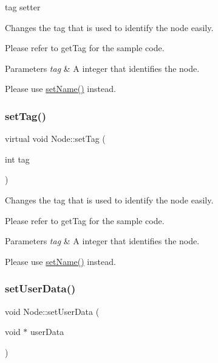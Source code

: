 tag setter 

Changes the tag that is used to identify the node easily.

Please refer to get\+Tag for the sample code.


\begin{DoxyParams}{Parameters}
{\em tag} & A integer that identifies the node.\\
\hline
\end{DoxyParams}
Please use {\ttfamily \hyperlink{classNode_a519730c66b26e65c6539a908e6905edc}{set\+Name()}} instead. \mbox{\label{classNode_ad07179e61008c76e7a996636267c74a5}} 
\subsubsection{\texorpdfstring{set\+Tag()}{setTag()}\hspace{0.1cm}{\footnotesize\ttfamily [2/2]}}
{\footnotesize\ttfamily virtual void Node\+::set\+Tag (\begin{DoxyParamCaption}\item[{int}]{tag }\end{DoxyParamCaption})\hspace{0.3cm}{\ttfamily [virtual]}}

Changes the tag that is used to identify the node easily.

Please refer to get\+Tag for the sample code.


\begin{DoxyParams}{Parameters}
{\em tag} & A integer that identifies the node.\\
\hline
\end{DoxyParams}
Please use {\ttfamily \hyperlink{classNode_a519730c66b26e65c6539a908e6905edc}{set\+Name()}} instead. \mbox{\label{classNode_ad07f1d7702df679c5d07772bcfd316a2}} 
\subsubsection{\texorpdfstring{set\+User\+Data()}{setUserData()}\hspace{0.1cm}{\footnotesize\ttfamily [1/2]}}
{\footnotesize\ttfamily void Node\+::set\+User\+Data (\begin{DoxyParamCaption}\item[{void $\ast$}]{user\+Data }\end{DoxyParamCaption})\hspace{0.3cm}{\ttfamily [virtual]}}



